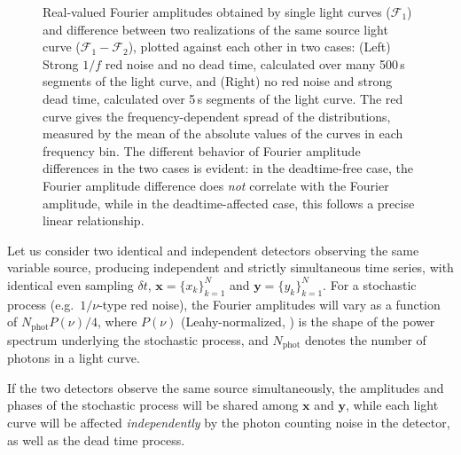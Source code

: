 \documentclass[twocolumn]{aastex61}
\begin{document}
\begin{figure*}
\caption{Real-valued Fourier amplitudes obtained by single light curves ($\mathcal{F}_1$) and difference between two realizations of the same source light curve ($\mathcal{F}_1 - \mathcal{F}_2$), plotted against each other in two cases: (Left) Strong $1/f$ red noise and no dead time, calculated over many 500\,s segments of the light curve, and (Right) no red noise and strong dead time, calculated over 5\,s segments of the light curve. 
The red curve gives the frequency-dependent spread of the distributions, measured by the mean of the absolute values of the curves in each frequency bin. 
The different behavior of Fourier amplitude differences in the two cases is evident: in the deadtime-free case, the Fourier amplitude difference does \textit{not} correlate with the Fourier amplitude, while in the deadtime-affected case, this follows a precise linear relationship.
}
\label{fig:fourierdiff}
\end{figure*}

Let us consider two identical and independent detectors observing the same variable source, producing independent and strictly simultaneous time series, with identical even sampling $\delta t$, $\mathbf{x} = \{x_k\}_{k=1}^N$ and $\mathbf{y} = \{y_k\}_{k=1}^N$. For a stochastic process (e.g.\ $1/\nu$-type red noise), the Fourier amplitudes will vary as a function of $N_{\mathrm{phot}}P(\nu)/4$, where $P(\nu)$ (Leahy-normalized, \citealt{Leahy+83}) is the shape of the power spectrum underlying the stochastic process, and $N_{\mathrm{phot}}$ denotes the number of photons in a light curve. 

If the two detectors observe the same source simultaneously, the amplitudes and phases of the stochastic process will be shared among $\mathbf{x}$ and $\mathbf{y}$, while each light curve will be affected \textit{independently} by the photon counting noise in the detector, as well as the dead time process. 
\end{document}

